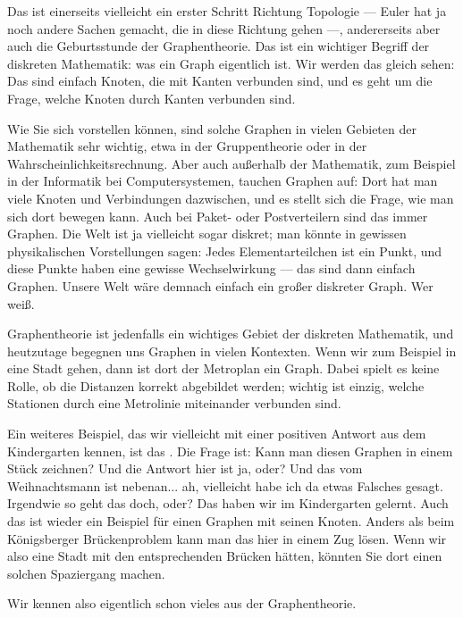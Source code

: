 \begin{spoken-clean}[00:08:08 - 00:13:02]
Das ist einerseits vielleicht ein erster Schritt Richtung Topologie --- Euler hat ja noch andere Sachen gemacht, die in diese Richtung gehen ---, andererseits aber auch die Geburtsstunde der Graphentheorie. Das ist ein wichtiger Begriff der diskreten Mathematik: was ein Graph eigentlich ist. Wir werden das gleich sehen: Das sind einfach Knoten, die mit Kanten verbunden sind, und es geht um die Frage, welche Knoten durch Kanten verbunden sind.

Wie Sie sich vorstellen können, sind solche Graphen in vielen Gebieten der Mathematik sehr wichtig, etwa in der Gruppentheorie oder in der Wahrscheinlichkeitsrechnung. Aber auch außerhalb der Mathematik, zum Beispiel in der Informatik bei Computersystemen, tauchen Graphen auf: Dort hat man viele Knoten und Verbindungen dazwischen, und es stellt sich die Frage, wie man sich dort bewegen kann. Auch bei Paket- oder Postverteilern sind das immer Graphen. Die Welt ist ja vielleicht sogar diskret; man könnte in gewissen physikalischen Vorstellungen sagen: Jedes Elementarteilchen ist ein Punkt, und diese Punkte haben eine gewisse Wechselwirkung --- das sind dann einfach Graphen. Unsere Welt wäre demnach einfach ein großer diskreter Graph. Wer weiß.

Graphentheorie ist jedenfalls ein wichtiges Gebiet der diskreten Mathematik, und heutzutage begegnen uns Graphen in vielen Kontexten. Wenn wir zum Beispiel in eine Stadt gehen, dann ist dort der Metroplan ein Graph. Dabei spielt es keine Rolle, ob die Distanzen korrekt abgebildet werden; wichtig ist einzig, welche Stationen durch eine Metrolinie miteinander verbunden sind.

Ein weiteres Beispiel, das wir vielleicht mit einer positiven Antwort aus dem Kindergarten kennen, ist das . Die Frage ist: Kann man diesen Graphen in einem Stück zeichnen? Und die Antwort hier ist ja, oder?  Und das vom Weihnachtsmann ist nebenan... ah, vielleicht habe ich da etwas Falsches gesagt. Irgendwie so geht das doch, oder? Das haben wir im Kindergarten gelernt. Auch das ist wieder ein Beispiel für einen Graphen mit seinen Knoten. Anders als beim Königsberger Brückenproblem kann man das hier in einem Zug lösen. Wenn wir also eine Stadt mit den entsprechenden Brücken hätten, könnten Sie dort einen solchen Spaziergang machen.

Wir kennen also eigentlich schon vieles aus der Graphentheorie.
\end{spoken-clean}

